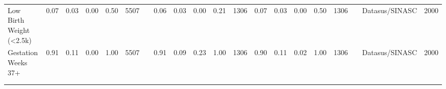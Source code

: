 \begin{sidewaystable}
\begin{table}[H]
\begin{footnotesize}
\begin{center}
{\begin{threeparttable}[b]
\begin{tabular}{rrrrrrrrrrrrrrrrrrrr}
    \multicolumn{1}{l}{Low Birth Weight (<2.5k)} & \multicolumn{1}{c}{0.07} & \multicolumn{1}{c}{0.03} & \multicolumn{1}{c}{0.00} & \multicolumn{1}{c}{0.50} & \multicolumn{1}{c}{5507} &       & \multicolumn{1}{c}{0.06} & \multicolumn{1}{c}{0.03} & \multicolumn{1}{c}{0.00} & \multicolumn{1}{c}{0.21} & \multicolumn{1}{c}{1306} & \multicolumn{1}{c}{0.07} & \multicolumn{1}{c}{0.03} & \multicolumn{1}{c}{0.00} & \multicolumn{1}{c}{0.50} & \multicolumn{1}{c}{1306} &       & \multicolumn{1}{c}{Datasus/SINASC} & \multicolumn{1}{c}{2000} \\
    \multicolumn{1}{l}{Gestation Weeks 37+ } & \multicolumn{1}{c}{0.91} & \multicolumn{1}{c}{0.11} & \multicolumn{1}{c}{0.00} & \multicolumn{1}{c}{1.00} & \multicolumn{1}{c}{5507} &       & \multicolumn{1}{c}{0.91} & \multicolumn{1}{c}{0.09} & \multicolumn{1}{c}{0.23} & \multicolumn{1}{c}{1.00} & \multicolumn{1}{c}{1306} & \multicolumn{1}{c}{0.90} & \multicolumn{1}{c}{0.11} & \multicolumn{1}{c}{0.02} & \multicolumn{1}{c}{1.00} & \multicolumn{1}{c}{1306} &       & \multicolumn{1}{c}{Datasus/SINASC} & \multicolumn{1}{c}{2000} \\
          &       &       &       &       &       &       &       &       &       &       &       &       &       &       &       &       &       &       &  \\
    \midrule
    \midrule
          &       &       &       &       &       &       &       &       &       &       &       &       &       &       &       &       &       &       &  \\
    \end{tabular}%
    



\end{threeparttable}
}
\end{center}
\end{footnotesize}
\end{table}
\end{sidewaystable}